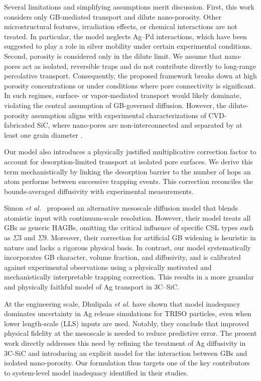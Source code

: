 \documentclass[%
preprint,
amsmath,amssymb,
aps,
]{revtex4-2}
\newcommand{\?}{\stackrel{?}{=}}
\begin{document}
Several limitations and simplifying assumptions merit discussion. First, this work considers only GB-mediated transport and dilute nano-porosity. Other microstructural features, irradiation effects, or chemical interactions are not treated. In particular, the model neglects Ag–Pd interactions, which have been suggested to play a role in silver mobility under certain experimental conditions. Second, porosity is considered only in the dilute limit. We assume that nano-pores act as isolated, reversible traps and do not contribute directly to long-range percolative transport. Consequently, the proposed framework breaks down at high porosity concentrations or under conditions where pore connectivity is significant. In such regimes, surface- or vapor-mediated transport would likely dominate, violating the central assumption of GB-governed diffusion. However, the dilute-porosity assumption aligns with experimental characterizations of CVD-fabricated SiC, where nano-pores are non-interconnected and separated by at least one grain diameter \cite{Lopez-Honorato2010,Lopez-Honorato2011}.

Our model also introduces a physically justified multiplicative correction factor to account for desorption-limited transport at isolated pore surfaces. We derive this term mechanistically by linking the desorption barrier to the number of hops an atom performs between successive trapping events. This correction reconciles the bounds-averaged diffusivity with experimental measurements.

Simon \textit{et al.}~\cite{Simon2022} proposed an alternative mesoscale diffusion model that blends atomistic input with continuum-scale resolution. However, their model treats all GBs as generic HAGBs, omitting the critical influence of specific CSL types such as $\Sigma 3$ and $\Sigma 9$. Moreover, their correction for artificial GB widening is heuristic in nature and lacks a rigorous physical basis. In contrast, our model systematically incorporates GB character, volume fraction, and diffusivity, and is calibrated against experimental observations using a physically motivated and mechanistically interpretable trapping correction. This results in a more granular and physically faithful model of Ag transport in 3C–SiC.

At the engineering scale, Dhulipala \textit{et al.} \cite{Dhulipala2024,Dhulipala2025} have shown that model inadequacy dominates uncertainty in Ag release simulations for TRISO particles, even when lower length-scale (LLS) inputs are used. Notably, they conclude that improved physical fidelity at the mesoscale is needed to reduce predictive error. The present work directly addresses this need by refining the treatment of Ag diffusivity in 3C-SiC and introducing an explicit model for the interaction between GBs and isolated nano-porosity. Our formulation thus targets one of the key contributors to system-level model inadequacy identified in their studies.
\end{document}
